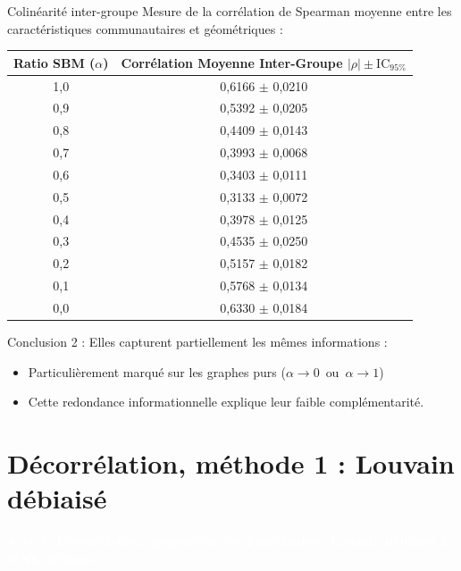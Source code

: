 \documentclass[10pt]{beamer}
\begin{document}
\begin{frame}{Colinéarité inter-groupe}
    \small Mesure de la corrélation de Spearman moyenne entre les caractéristiques communautaires et géométriques :
    
    \begin{table}[!ht]
        \centering
        \begin{tabular}{cc}
            \hline
            \textbf{Ratio SBM ($\alpha$)} & \textbf{Corrélation Moyenne Inter-Groupe $|\rho| \pm \text{IC}_{95\%}$} \\
            \hline
            1,0 & 0,6166 $\pm$ 0,0210 \\
            0,9 & 0,5392 $\pm$ 0,0205 \\
            0,8 & 0,4409 $\pm$ 0,0143 \\
            0,7 & 0,3993 $\pm$ 0,0068 \\
            0,6 & 0,3403 $\pm$ 0,0111 \\
            0,5 & 0,3133 $\pm$ 0,0072 \\
            0,4 & 0,3978 $\pm$ 0,0125 \\
            0,3 & 0,4535 $\pm$ 0,0250 \\
            0,2 & 0,5157 $\pm$ 0,0182 \\
            0,1 & 0,5768 $\pm$ 0,0134 \\
            0,0 & 0,6330 $\pm$ 0,0184 \\
            \hline
        \end{tabular}
    \end{table}

    \begin{block}{\small Conclusion 2 :  Elles capturent partiellement les mêmes informations :}
        \begin{itemize}
            \scriptsize
            \item Particulièrement marqué sur les graphes purs ($ \alpha \to 0 \enspace \text{ou} \enspace \alpha \to 1 $)
            \item Cette redondance informationnelle explique leur faible complémentarité.
        \end{itemize}
    \end{block}
\end{frame}


\section{Décorrélation, méthode 1 : Louvain débiaisé}
{
\begin{frame}[plain] %
    \centering
    \vfill
    \Huge \bfseries \textcolor{white}{4. et 5. Décorrélation, proposition de 2 méthodes : Louvain débiaisé \& SiNE débiaisé}
    \vfill
\end{frame}
}
\end{document}
